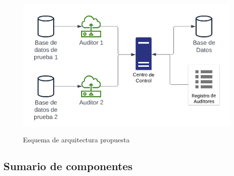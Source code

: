 \documentclass{article}
\begin{document}
        \begin{figure}[htbp]
            \centering
            \includegraphics[scale=0.5]{img/arquitectura_propuesta.png}
            \label{fig:proposed_architecture}
            \caption{Esquema de arquitectura propuesta}
        \end{figure}

        \subsection{Sumario de componentes}
\end{document}
